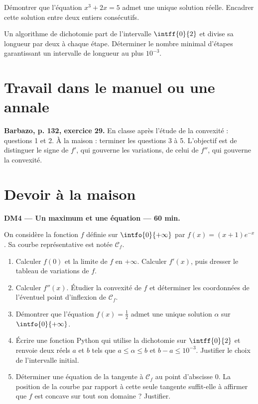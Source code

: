 Démontrer que l'équation $x^3+2x=5$ admet une unique solution réelle. Encadrer cette solution entre deux entiers consécutifs.

Un algorithme de dichotomie part de l'intervalle $\intff{0}{2}$ et divise sa longueur par deux à chaque étape. Déterminer le nombre minimal d'étapes garantissant un intervalle de longueur au plus $10^{-3}$.

\section{Travail dans le manuel ou une annale}\textbf{Barbazo, p. 132, exercice 29.} En classe après l'étude de la convexité : questions 1 et 2. À la maison : terminer les questions 3 à 5. L'objectif est de distinguer le signe de $f'$, qui gouverne les variations, de celui de $f''$, qui gouverne la convexité.

\mxnewpage
\section{Devoir à la maison}\textbf{DM4 --- Un maximum et une équation --- 60 min.}\par On considère la fonction $f$ définie sur $\intfo{0}{+\infty}$ par $f(x)=(x+1)e^{-x}$. Sa courbe représentative est notée $\mathcal C_f$.
\begin{enumerate}\item Calculer $f(0)$ et la limite de $f$ en $+\infty$. Calculer $f' (x)$, puis dresser le tableau de variations de $f$.
\item Calculer $f'' (x)$. Étudier la convexité de $f$ et déterminer les coordonnées de l'éventuel point d'inflexion de $\mathcal C_f$.
\item Démontrer que l'équation $f(x)=\frac12$ admet une unique solution $\alpha$ sur $\intfo{0}{+\infty}$.
\item Écrire une fonction Python qui utilise la dichotomie sur $\intff{0}{2}$ et renvoie deux réels $a$ et $b$ tels que $a\le\alpha\le b$ et $b-a\le10^{-3}$. Justifier le choix de l'intervalle initial.
\item Déterminer une équation de la tangente à $\mathcal C_f$ au point d'abscisse $0$. La position de la courbe par rapport à cette seule tangente suffit-elle à affirmer que $f$ est concave sur tout son domaine ? Justifier.\end{enumerate}

